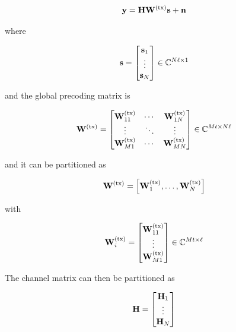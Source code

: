 \begin{equation} \label{eq:system_model}
    \mathbf{y} = \mathbf{H} \mathbf{W}^{(\text{tx})} \mathbf{s} + \mathbf{n}
\end{equation}

\noindent
where

\begin{equation} \label{data_symbols}
    \mathbf{s} = \begin{bmatrix}
        \mathbf{s}_1 \\
        \vdots \\
        \mathbf{s}_N
    \end{bmatrix} \in \mathbb{C}^{N\ell \times 1}
\end{equation}

\noindent
and the global precoding matrix is

\begin{equation} \label{eq:precoding_matrix}
    \mathbf{W}^{(\text{tx})} = \begin{bmatrix}
        \mathbf{W}^{(\text{tx})}_{11} & \cdots & \mathbf{W}^{(\text{tx})}_{1N} \\
        \vdots    & \ddots & \vdots \\
        \mathbf{W}^{(\text{tx})}_{M1} & \cdots & \mathbf{W}^{(\text{tx})}_{MN} \\
    \end{bmatrix} \in \mathbb{C}^{Mt \times N\ell}
\end{equation}

\noindent
and it can be partitioned as

\begin{equation} \label{eq:precod_partition}
    \mathbf{W}^{(\text{tx})} = \left[ \mathbf{W}^{(\text{tx})}_1, \ldots, \mathbf{W}^{(\text{tx})}_N \right]
\end{equation}

\noindent
with

\begin{equation} \label{eq_precod_user}
    \mathbf{W}^{(\text{tx})}_i = \begin{bmatrix}
        \mathbf{W}^{(\text{tx})}_{11} \\
        \vdots \\
        \mathbf{W}^{(\text{tx})}_{M1}
    \end{bmatrix} \in \mathbb{C}^{Mt \times \ell}
\end{equation}

The channel matrix can then be partitioned as

\begin{equation} \label{eq:ch_mat_partition}
    \mathbf{H} = \begin{bmatrix}
        \mathbf{H}_1 \\
        \vdots \\
        \mathbf{H}_N
    \end{bmatrix}
\end{equation}

